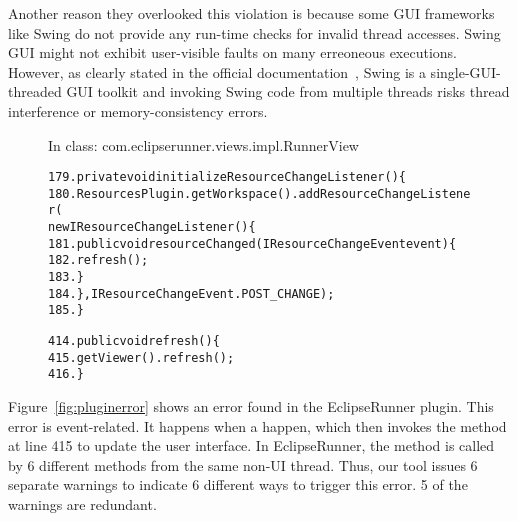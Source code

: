 Another reason they overlooked this violation is because some GUI frameworks like Swing
do not provide any run-time checks for invalid thread accesses. Swing
GUI might not exhibit user-visible faults on many erreoneous executions.
However, as clearly stated in the official documentation~\cite{swing}, Swing is a single-GUI-threaded GUI
toolkit and invoking Swing code from multiple threads risks thread interference
or memory-consistency errors.



\begin{figure}[t]
\hspace{4mm}\small{In class: com.eclipserunner.views.impl.RunnerView}
\vspace{-2mm}
\begin{CodeOut}
\begin{alltt} 
179.private void initializeResourceChangeListener() \{
180.  ResourcesPlugin.getWorkspace().addResourceChangeListener(
        new IResourceChangeListener() \{
181.      public void resourceChanged(IResourceChangeEvent event) \{
182.        refresh();
183.      \}
184.  \}, IResourceChangeEvent.POST\_CHANGE);
185.\}

414.public void refresh() \{
415.  getViewer().refresh();
416.\}
\end{alltt}
\end{CodeOut}
\vspace*{-2.0ex}  %
\end{figure}

Figure~\ref{fig:pluginerror} shows an error found in the EclipseRunner
plugin. This error is event-related. It happens when a 
 happen, which then invokes the 
method at line 415 to update the user interface. In EclipseRunner,
the  method is
called by 6 different methods from the same non-UI thread. Thus, our
tool issues 6 separate warnings to indicate
6 different ways to trigger this error. 5 of the warnings are redundant.

